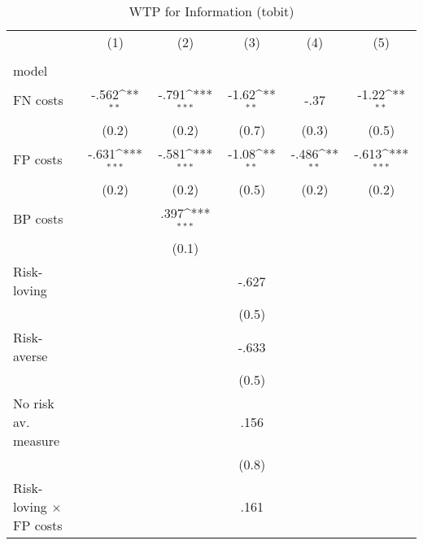 \begin{table}[htbp]\centering
\def\sym#1{\ifmmode^{#1}\else\(^{#1}\)\fi}
\caption{WTP for Information (tobit)}
\begin{tabular}{l*{5}{c}}
\hline\hline
                &\multicolumn{1}{c}{(1)}&\multicolumn{1}{c}{(2)}&\multicolumn{1}{c}{(3)}&\multicolumn{1}{c}{(4)}&\multicolumn{1}{c}{(5)}\\
                &\multicolumn{1}{c}{}&\multicolumn{1}{c}{}&\multicolumn{1}{c}{}&\multicolumn{1}{c}{}&\multicolumn{1}{c}{}\\
\hline
model           &                  &                  &                  &                  &                  \\
FN costs        &    -.562\sym{**} &    -.791\sym{***}&    -1.62\sym{**} &     -.37         &    -1.22\sym{**} \\
                &    (0.2)         &    (0.2)         &    (0.7)         &    (0.3)         &    (0.5)         \\
FP costs        &    -.631\sym{***}&    -.581\sym{***}&    -1.08\sym{**} &    -.486\sym{**} &    -.613\sym{***}\\
                &    (0.2)         &    (0.2)         &    (0.5)         &    (0.2)         &    (0.2)         \\
BP costs        &                  &     .397\sym{***}&                  &                  &                  \\
                &                  &    (0.1)         &                  &                  &                  \\
Risk-loving     &                  &                  &    -.627         &                  &                  \\
                &                  &                  &    (0.5)         &                  &                  \\
Risk-averse     &                  &                  &    -.633         &                  &                  \\
                &                  &                  &    (0.5)         &                  &                  \\
No risk av. measure&                  &                  &     .156         &                  &                  \\
                &                  &                  &    (0.8)         &                  &                  \\
Risk-loving $\times$ FP costs&                  &                  &     .161         &                  &                  \\

\end{tabular}
\end{table}
